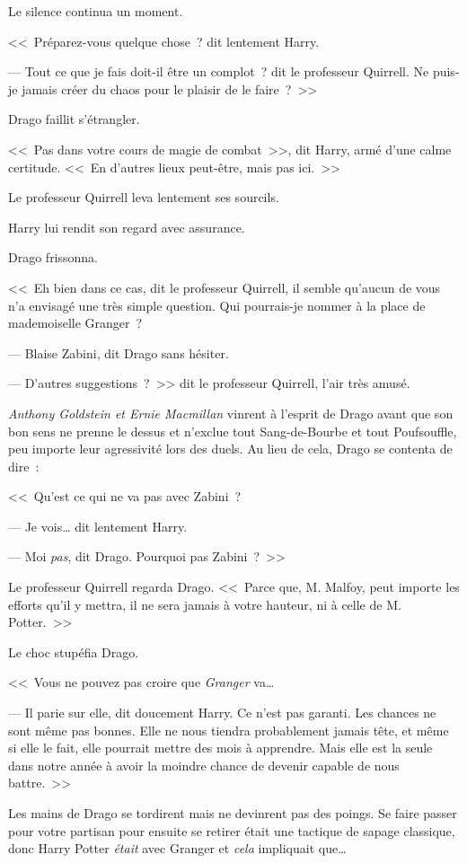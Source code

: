 Le silence continua un moment.

<<~Préparez-vous quelque chose~? dit lentement Harry.

--- Tout ce que je fais doit-il être un complot~? dit le professeur Quirrell. Ne puis-je jamais créer du chaos pour le plaisir de le faire~?~>>

Drago faillit s'étrangler.

<<~Pas dans votre cours de magie de combat~>>, dit Harry, armé d'une calme certitude. <<~En d'autres lieux peut-être, mais pas ici.~>>

Le professeur Quirrell leva lentement ses sourcils.

Harry lui rendit son regard avec assurance.

Drago frissonna.

<<~Eh bien dans ce cas, dit le professeur Quirrell, il semble qu'aucun de vous n'a envisagé une très simple question. Qui pourrais-je nommer à la place de mademoiselle Granger~?

--- Blaise Zabini, dit Drago sans hésiter.

--- D'autres suggestions~?~>> dit le professeur Quirrell, l'air très amusé.

\emph{Anthony Goldstein et Ernie Macmillan} vinrent à l'esprit de Drago avant que son bon sens ne prenne le dessus et n'exclue tout Sang-de-Bourbe et tout Poufsouffle, peu importe leur agressivité lors des duels. Au lieu de cela, Drago se contenta de dire~:

<<~Qu'est ce qui ne va pas avec Zabini~?

--- Je vois… dit lentement Harry.

--- Moi \emph{pas}, dit Drago. Pourquoi pas Zabini~?~>>

Le professeur Quirrell regarda Drago. <<~Parce que, M. Malfoy, peut importe les efforts qu'il y mettra, il ne sera jamais à votre hauteur, ni à celle de M. Potter.~>>

Le choc stupéfia Drago.

<<~Vous ne pouvez pas croire que \emph{Granger} va…

--- Il parie sur elle, dit doucement Harry. Ce n'est pas garanti. Les chances ne sont même pas bonnes. Elle ne nous tiendra probablement jamais tête, et même si elle le fait, elle pourrait mettre des mois à apprendre. Mais elle est la seule dans notre année à avoir la moindre chance de devenir capable de nous battre.~>>

Les mains de Drago se tordirent mais ne devinrent pas des poings. Se faire passer pour votre partisan pour ensuite se retirer était une tactique de sapage classique, donc Harry Potter \emph{était} avec Granger et \emph{cela} impliquait que…

